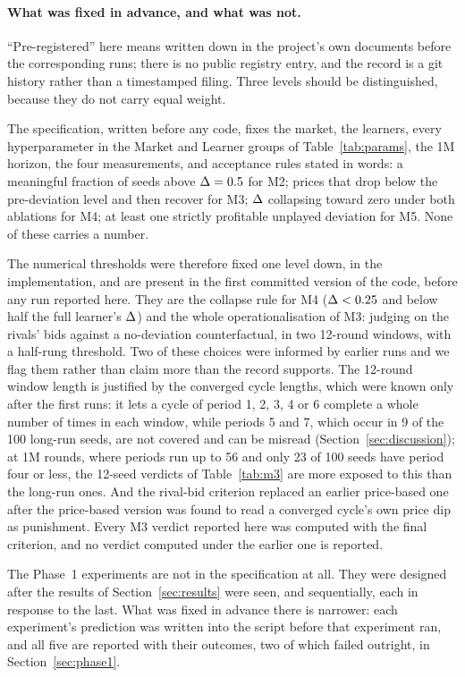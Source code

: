 \paragraph{What was fixed in advance, and what was not.}
``Pre-registered'' here means written down in the project's own documents before the corresponding runs; there is no public registry entry, and the record is a git history rather than a timestamped filing. Three levels should be distinguished, because they do not carry equal weight.

The specification, written before any code, fixes the market, the learners, every hyperparameter in the Market and Learner groups of Table~\ref{tab:params}, the 1M horizon, the four measurements, and acceptance rules stated in words: a meaningful fraction of seeds above $\Delta = 0.5$ for M2; prices that drop below the pre-deviation level and then recover for M3; $\Delta$ collapsing toward zero under both ablations for M4; at least one strictly profitable unplayed deviation for M5. None of these carries a number.

The numerical thresholds were therefore fixed one level down, in the implementation, and are present in the first committed version of the code, before any run reported here. They are the collapse rule for M4 ($\Delta < 0.25$ and below half the full learner's $\Delta$) and the whole operationalisation of M3: judging on the rivals' bids against a no-deviation counterfactual, in two 12-round windows, with a half-rung threshold. Two of these choices were informed by earlier runs and we flag them rather than claim more than the record supports. The 12-round window length is justified by the converged cycle lengths, which were known only after the first runs: it lets a cycle of period 1, 2, 3, 4 or 6 complete a whole number of times in each window, while periods 5 and 7, which occur in 9 of the 100 long-run seeds, are not covered and can be misread (Section~\ref{sec:discussion}); at 1M rounds, where periods run up to 56 and only 23 of 100 seeds have period four or less, the 12-seed verdicts of Table~\ref{tab:m3} are more exposed to this than the long-run ones. And the rival-bid criterion replaced an earlier price-based one after the price-based version was found to read a converged cycle's own price dip as punishment. Every M3 verdict reported here was computed with the final criterion, and no verdict computed under the earlier one is reported.

The Phase~1 experiments are not in the specification at all. They were designed after the results of Section~\ref{sec:results} were seen, and sequentially, each in response to the last. What was fixed in advance there is narrower: each experiment's prediction was written into the script before that experiment ran, and all five are reported with their outcomes, two of which failed outright, in Section~\ref{sec:phase1}.

